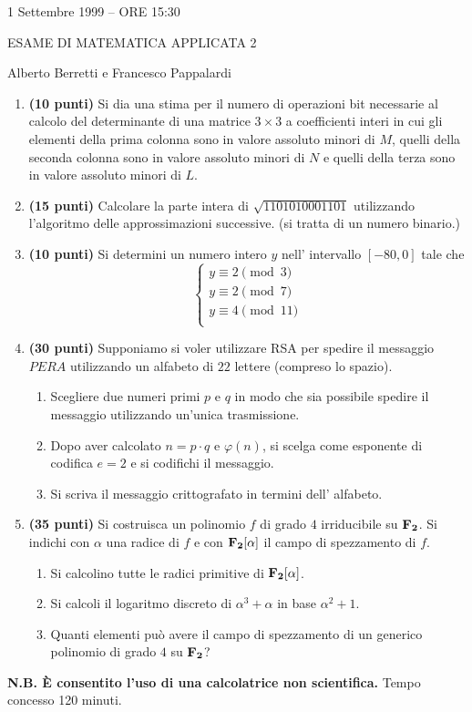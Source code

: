 \documentclass{article}
\begin{document}
\thispagestyle{empty}
\centerline{1 Settembre 1999 -- ORE 15:30}
\centerline{ESAME DI MATEMATICA APPLICATA 2}
\centerline{Alberto Berretti e Francesco Pappalardi}\bigskip

\begin{enumerate}

\item {\bf (10 punti)} Si dia una stima per il numero di operazioni
bit necessarie al calcolo del determinante di 
una matrice $3\times3$ a coefficienti interi in cui
gli elementi della prima colonna sono in valore 
assoluto minori di $M$, quelli della seconda 
colonna sono in valore assoluto minori di $N$ e
quelli della terza sono in valore assoluto
minori di $L$.

\item {\bf (15 punti)} 
Calcolare la parte intera di $\sqrt{1101010001101}$ utilizzando
l'algo\-ritmo delle approssimazioni successive. (si tratta di un
numero binario.)
\bigskip\bigskip

\item  {\bf (10 punti)} Si determini un numero intero $y$ nell'
intervallo $[-80,0]$ tale che
$$\left\{\begin{array}{l}
y\equiv 2\pmod 3 \\
y\equiv 2 \pmod 7 \\
y\equiv 4 \pmod{11} \\
\end{array}\right.$$
\bigskip\bigskip

\item {\bf (30 punti)} Supponiamo si voler utilizzare RSA per
spedire il messaggio $PERA$ utilizzando un alfabeto di
$22$ lettere (compreso lo spazio).

\begin{enumerate}
\item Scegliere due numeri primi $p$ e $q$ in modo che sia
possibile spedire il messaggio utilizzando un'unica trasmissione.
\item Dopo aver calcolato $n=p\cdot q$ e $\varphi(n)$, si scelga
come esponente di codifica $e=2$ e si codifichi il messaggio.
\item Si scriva il messaggio crittografato in termini dell'
alfabeto.
\end{enumerate}
 \bigskip\bigskip

\item {\bf (35 punti)} Si costruisca un polinomio $f$ di grado $4$ irriducibile
su $\bf F_2$. Si indichi con $\alpha$ una radice di $f$ e con
$\bf F_2[\alpha]$ il campo di spezzamento di $f$.
\begin{enumerate}
\item Si calcolino tutte le radici primitive di $\bf F_2[\alpha]$. 
\item 
Si calcoli il logaritmo discreto di $\alpha^3+\alpha$ in base $\alpha^2+1$.
\item 
Quanti elementi pu\`o avere il campo di spezzamento
di un generico polinomio di grado $4$ su $\bf F_2$?
\end{enumerate} \bigskip\bigskip
\end{enumerate}

{\bf N.B. \`E consentito l'uso di una calcolatrice non scientifica.}
Tempo concesso 120 minuti.
\end{document}
